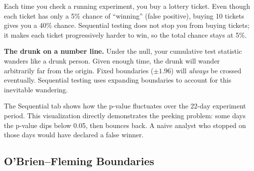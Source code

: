 \documentclass[11pt,a4paper]{article}
\begin{document}
\vspace{8pt}

\begin{intuition}
Each time you check a running experiment, you buy a lottery ticket. Even though each ticket has only a 5\% chance of ``winning'' (false positive), buying 10 tickets gives you a 40\% chance. Sequential testing does not stop you from buying tickets; it makes each ticket progressively harder to win, so the total chance stays at 5\%.

\medskip
\textbf{The drunk on a number line.} Under the null, your cumulative test statistic wanders like a drunk person. Given enough time, the drunk will wander arbitrarily far from the origin. Fixed boundaries ($\pm 1.96$) will \emph{always} be crossed eventually. Sequential testing uses expanding boundaries to account for this inevitable wandering.
\end{intuition}

\vspace{8pt}

\begin{application}
The Sequential tab shows how the p-value fluctuates over the 22-day experiment period. This visualization directly demonstrates the peeking problem: some days the p-value dips below 0.05, then bounces back. A naive analyst who stopped on those days would have declared a false winner.
\end{application}

\subsection{O'Brien--Fleming Boundaries}
\end{document}
